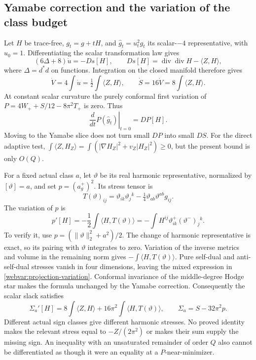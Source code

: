 \subsection{Yamabe correction and the variation of the class budget}

Let $H$ be trace-free, $g_t=g+tH$, and
$\widehat g_t=u_t^2g_t$ its scalar-$-4$ representative, with $u_0=1$.
Differentiating the scalar transformation law gives
\begin{equation}\label{webvar:yamabe-variation}
 (6\Delta+8)\dot u=-Ds[H],\qquad
 Ds[H]=\operatorname{div}\operatorname{div}H-\langle Z,H\rangle,
\end{equation}
where $\Delta=d^*d$ on functions.  Integration on the closed manifold
therefore gives
\begin{equation}\label{webvar:yamabe-volume-variation}
 \dot V=4\int\dot u=\tfrac12\int\langle Z,H\rangle,\qquad
 \dot S=16\dot V=8\int\langle Z,H\rangle.
\end{equation}
At constant scalar curvature the purely conformal first variation of
$P=4W_++S/12-8\pi^2T_+$ is zero.  Thus
\[
 \left.\frac d{dt}P(\widehat g_t)\right|_{t=0}=DP[H].
\]
Moving to the Yamabe slice does not turn small $DP$ into small $DS$.
For the direct adaptive test,
$\int\langle Z,H_Z\rangle
=\int(|\nabla H_Z|^2+v_Z|H_Z|^2)\ge0$,
but the present bound is only $O(Q)$.

For a fixed actual class $a$, let $\vartheta$ be its real harmonic
representative, normalized by $[\vartheta]=a$, and set
$p=(a_g^+)^2$.  Its stress tensor is
\[
 T(\vartheta)_{ij}
 =\vartheta_{ik}\vartheta_j{}^k
             -\tfrac14\vartheta_{ab}\vartheta^{ab}g_{ij}.
\]
The variation of $p$ is
\begin{equation}\label{webvar:projection-variation}
 p'[H]=-\frac12\int\langle H,T(\vartheta)\rangle
       =-\int H^{ij}\vartheta^+_{ik}(\vartheta^-)_j{}^k.
\end{equation}
To verify it, use
$p=(\|\vartheta\|_2^2+a^2)/2$.
The change of harmonic representative is exact, so its pairing with
$\vartheta$ integrates to zero.  Variation of the inverse metrics
and volume in the remaining norm gives
$-\int\langle H,T(\vartheta)\rangle$.
Pure self-dual and anti-self-dual stresses vanish in four dimensions,
leaving the mixed expression in \eqref{webvar:projection-variation}.
Conformal invariance of the middle-degree Hodge star makes the formula
unchanged by the Yamabe correction.
Consequently the scalar slack satisfies
\begin{equation}\label{webvar:slack-variation}
 \Sigma_a'[H]
 =8\int\langle Z,H\rangle+16\pi^2\int\langle H,T(\vartheta)\rangle,
 \qquad \Sigma_a=S-32\pi^2p.
\end{equation}
Different actual sign classes give different harmonic stresses.
No proved identity makes the relevant stress equal to
$-Z/(2\pi^2)$ or makes their sum supply the missing sign.
An inequality with an unsaturated remainder of order $Q$ also
cannot be differentiated as though it were an equality at a
$P$-near-minimizer.

